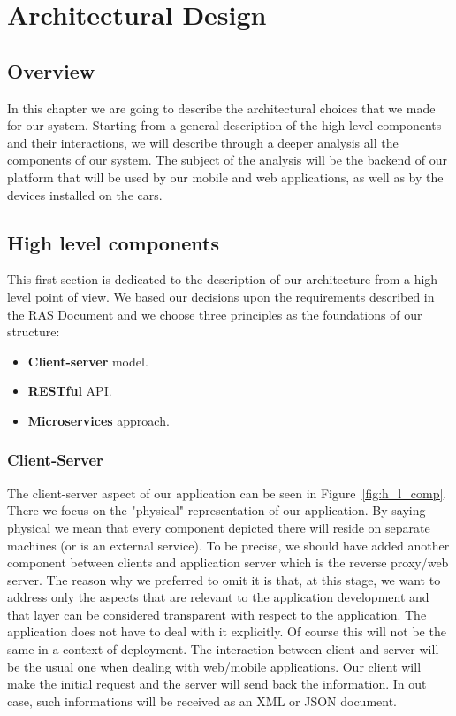 \pagebreak
\section{Architectural Design}
  
\subsection{Overview }
In this chapter we are going to describe the architectural choices that we made for our system. 
Starting from a general description of the high level components and their interactions,
we will describe through a deeper analysis all the components of our system.
The subject of the analysis will be the backend of our platform that will be used by
our mobile and web applications, as well as by the devices installed on the cars.

\subsection{High level components}
This first section is dedicated to the description of our architecture from a high level
point of view. We based our decisions upon the requirements described in the RAS Document 
and we choose three principles as the foundations of our structure: 
\begin{itemize}
    \item \textbf{Client-server} model.
    \item \textbf{RESTful} API.
    \item \textbf{Microservices} approach.
\end{itemize}

\subsubsection{Client-Server}
The client-server aspect of our application can be seen in Figure~\ref{fig:h_l_comp}.
There we focus on the "physical" representation of our application. By saying physical we mean that
every component depicted there will reside on separate machines (or is an external service).
To be precise, we should have added another component between clients and
application server which is the reverse proxy/web server. The reason why we preferred to
omit it is that, at this stage, we want to address only the aspects that are relevant to the
application development and that layer can be considered transparent with respect to the application.
The application does not have to deal with it explicitly.
Of course this will not be the same in a context of deployment.
The interaction between client and server will be the usual one when dealing with web/mobile
applications. Our client will make the initial request and the server will send back the
information. In out case, such informations will be received as an XML or JSON document.

